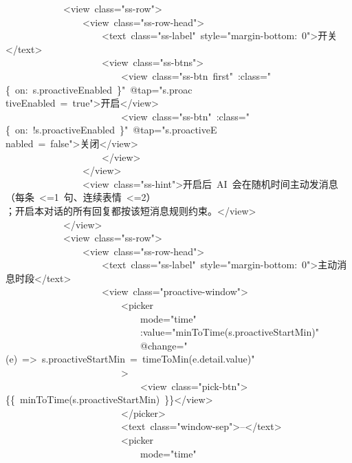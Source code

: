 \documentclass[a4paper,10pt]{article}
\begin{document}
{\ttfamily\footnotesize\raggedright
~~~~~~~~~~~~<view~class="ss-row">\\
~~~~~~~~~~~~~~~~<view~class="ss-row-head">\\
~~~~~~~~~~~~~~~~~~~~<text~class="ss-label"~style="margin-bottom:~0">开关</text>\\
~~~~~~~~~~~~~~~~~~~~<view~class="ss-btns">\\
~~~~~~~~~~~~~~~~~~~~~~~~<view~class="ss-btn~first"~:class="\{~on:~s.proactiveEnabled~\}"~@tap="s.proac\\
tiveEnabled~=~true">开启</view>\\
~~~~~~~~~~~~~~~~~~~~~~~~<view~class="ss-btn"~:class="\{~on:~!s.proactiveEnabled~\}"~@tap="s.proactiveE\\
nabled~=~false">关闭</view>\\
~~~~~~~~~~~~~~~~~~~~</view>\\
~~~~~~~~~~~~~~~~</view>\\
~~~~~~~~~~~~~~~~<view~class="ss-hint">开启后~AI~会在随机时间主动发消息（每条~<=1~句、连续表情~<=2）\\
；开启本对话的所有回复都按该短消息规则约束。</view>\\
~~~~~~~~~~~~</view>\\
~~~~~~~~~~~~<view~class="ss-row">\\
~~~~~~~~~~~~~~~~<view~class="ss-row-head">\\
~~~~~~~~~~~~~~~~~~~~<text~class="ss-label"~style="margin-bottom:~0">主动消息时段</text>\\
~~~~~~~~~~~~~~~~~~~~<view~class="proactive-window">\\
~~~~~~~~~~~~~~~~~~~~~~~~<picker\\
~~~~~~~~~~~~~~~~~~~~~~~~~~~~mode="time"\\
~~~~~~~~~~~~~~~~~~~~~~~~~~~~:value="minToTime(s.proactiveStartMin)"\\
~~~~~~~~~~~~~~~~~~~~~~~~~~~~@change="(e)~=>~s.proactiveStartMin~=~timeToMin(e.detail.value)"\\
~~~~~~~~~~~~~~~~~~~~~~~~>\\
~~~~~~~~~~~~~~~~~~~~~~~~~~~~<view~class="pick-btn">\{\{~minToTime(s.proactiveStartMin)~\}\}</view>\\
~~~~~~~~~~~~~~~~~~~~~~~~</picker>\\
~~~~~~~~~~~~~~~~~~~~~~~~<text~class="window-sep">--</text>\\
~~~~~~~~~~~~~~~~~~~~~~~~<picker\\
~~~~~~~~~~~~~~~~~~~~~~~~~~~~mode="time"\\
}
\end{document}
